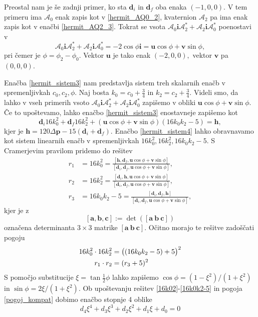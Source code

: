 \documentclass[12pt,a4paper,twoside]{article}
\theoremstyle{definition} %
\theoremstyle{plain} %
\theoremstyle{primerstyle}
\numberwithin{equation}{section}  %
\newcommand{\aV}{\mathbf{a}}
\newcommand{\bV}{\mathbf{b}}
\newcommand{\cV}{\mathbf{c}}
\newcommand{\dV}{\mathbf{d}}
\newcommand{\hV}{\mathbf{h}}
\newcommand{\pV}{\mathbf{p}}
\newcommand{\iV}{\mathbf{i}}
\newcommand{\uV}{\mathbf{u}}
\newcommand{\vV}{\mathbf{v}}
\newcommand{\AQ}{\mathcal{A}}
\begin{document}
Preostal nam je še zadnji primer, ko sta $\dV_i$ in $\dV_f$ oba enaka $(-1,0,0).$ V tem primeru ima $\AQ_0$ enak zapis kot v \eqref{hermit_AQ0_2}, kvaternion $\AQ_2$ pa ima enak zapis kot v enačbi \eqref{hermit_AQ2_3}. Tokrat se vsota $\AQ_0\iV\AQ_2^*+\AQ_2\iV\AQ_0^*$ poenostavi v
\begin{equation}
	\label{vsotaA0iA2_4}
	\AQ_0\iV\AQ_2^*+\AQ_2\iV\AQ_0^*=-2\cos\phi\iV=\uV\cos\phi+\vV\sin\phi,
\end{equation}
pri čemer je $\phi=\phi_2-\phi_0$. Vektor $\uV$ je tako enak $(-2,0,0),$ vektor $\vV$ pa $(0,0,0).$

Enačba \eqref{hermit_sistem3} nam predstavlja sistem treh skalarnih enačb v spremenljivkah $c_0,c_2,\phi.$ Naj bosta $k_0=c_0+\frac{3}{4}$ in $k_2=c_2+\frac{3}{4}.$ Videli smo, da lahko v vseh primerih vsoto $\AQ_0\iV\AQ_2^*+\AQ_2\iV\AQ_0^*$ zapišemo v obliki $\uV\cos\phi+\vV\sin\phi$. Če to upoštevamo, lahko enačbo \eqref{hermit_sistem3} enostavneje zapišemo kot
\begin{equation}
	\label{hermit_sistem4}
	\dV_i16k_0^2+\dV_f16k_2^2+(\uV\cos\phi+\vV\sin\phi)(16k_0k_2-5)=\hV,
\end{equation}
kjer je $\hV=120\Delta\pV-15(\dV_i+\dV_f)$. Enačbo \eqref{hermit_sistem4} lahko obravnavamo kot sistem linearnih enačb v spremenljivkah $16k_0^2,16k_2^2,16k_0k_2-5.$ S Cramerjevim pravilom pridemo do rešitev
\begin{align}
	r_1&=16k_0^2=\frac{[\hV,\dV_f,\uV\cos\phi+\vV\sin\phi]}{[\dV_i,\dV_f,\uV\cos\phi+\vV\sin\phi]},\label{16k02}\\
	r_2&=16k_2^2=\frac{[\dV_i,\hV,\uV\cos\phi+\vV\sin\phi]}{[\dV_i,\dV_f,\uV\cos\phi+\vV\sin\phi]},\label{16k22}\\
	r_3&=16k_0k_2-5=\frac{[\dV_i,\dV_f,\hV]}{[\dV_i,\dV_f,\uV\cos\phi+\vV\sin\phi]}\label{16k0k2-5},
\end{align}
kjer je z $$[\aV,\bV,\cV]:=\det([\aV\ \bV\ \cV])$$ označena determinanta $3\times3$ matrike $[\aV\ \bV\ \cV].$ Očitno morajo te rešitve zadoščati pogoju
\begin{align}
	\label{pogoj_kompat}
	16k_0^2\cdot16k_2^2&=\big((16k_0k_2-5)+5\big)^2\notag\\
	r_1\cdot r_2&=(r_3+5)^2
\end{align}
S pomočjo substitucije $\xi=\tan\frac{1}{2}\phi$ lahko zapišemo $\cos\phi=(1-\xi^2)/(1+\xi^2)$ in $\sin\phi=2\xi/(1+\xi^2).$ Ob upoštevanju rešitev \eqref{16k02}-\eqref{16k0k2-5} in pogoja \eqref{pogoj_kompat} dobimo enačbo stopnje 4 oblike
\begin{equation}
	\label{enacba_stopnja4}
	d_4\xi^4+d_3\xi^3+d_2\xi^2+d_1\xi+d_0=0
\end{equation}
\end{document}
